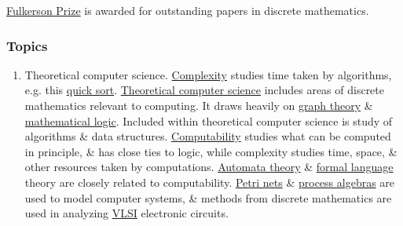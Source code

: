 \documentclass{article}
\begin{document}
\href{https://en.wikipedia.org/wiki/Fulkerson_Prize}{Fulkerson Prize} is awarded for outstanding papers in discrete mathematics.

\subsubsection{Topics}

\begin{enumerate}
	\item {\sf Theoretical computer science.} {\sf\href{https://en.wikipedia.org/wiki/Computational_complexity_theory}{Complexity} studies time taken by algorithms, e.g. this \href{https://en.wikipedia.org/wiki/Quicksort}{quick sort}.} \href{https://en.wikipedia.org/wiki/Theoretical_computer_science}{Theoretical computer science} includes areas of discrete mathematics relevant to computing. It draws heavily on \href{https://en.wikipedia.org/wiki/Graph_theory}{graph theory} \& \href{https://en.wikipedia.org/wiki/Mathematical_logic}{mathematical logic}. Included within theoretical computer science is study of algorithms \& data structures. \href{https://en.wikipedia.org/wiki/Computability}{Computability} studies what can be computed in principle, \& has close ties to logic, while complexity studies time, space, \& other resources taken by computations. \href{https://en.wikipedia.org/wiki/Automata_theory}{Automata theory} \& \href{https://en.wikipedia.org/wiki/Formal_language}{formal language} theory are closely related to computability. \href{https://en.wikipedia.org/wiki/Petri_net}{Petri nets} \& \href{https://en.wikipedia.org/wiki/Process_algebra}{process algebras} are used to model computer systems, \& methods from discrete mathematics are used in analyzing \href{https://en.wikipedia.org/wiki/VLSI}{VLSI} electronic circuits.
	

\end{enumerate}
\end{document}
